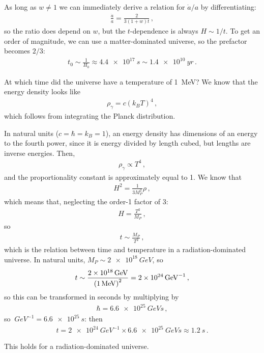 \documentclass[main.tex]{subfiles}
\begin{document}
As long as \(w \neq 1\) we can immediately derive a relation for \(\dot{a} / a \) by differentiating: 
%
\begin{align}
\frac{\dot{a}}{a} = \frac{2 }{3 (1+w) t}
\,,
\end{align}
%
so the ratio does depend on \(w\), but the \(t\)-dependence is always \(H \sim 1/t\). To get an order of magnitude, we can use a matter-dominated universe, so the prefactor becomes \(2/3\): 
%
\begin{align}
t_0 \sim \frac{1}{H_0} \approx  \SI{4.4e17}{s} \sim \SI{1.4e10}{yr}
\,.
\end{align}
%

At which time did the universe have a temperature of \SI{1 }{MeV}? We know that the energy density looks like 
%
\begin{align}
\rho_{\gamma } = c (k_B T)^{4}
\,,
\end{align}
%
which follows from integrating the Planck distribution. 

In natural units (\(c = \hbar = k_B =1\)), an energy density has dimensions of an energy to the fourth power, since it is energy divided by length cubed, but lengths are inverse energies. Then, 
%
\begin{align}
\rho_{\gamma } \propto T^{4}
\,,
\end{align}
and the proportionality constant is approximately equal to 1. 
We know that 
%
\begin{align}
H^2 = \frac{1}{3 M_P^2} \rho 
\,,
\end{align}
%
which  means that, neglecting the order-1 factor of 3:
%
\begin{align}
H = \frac{T^2}{M_P}
\,,
\end{align}
%
so 
%
\begin{align}
t \sim \frac{M_P}{T^2}
\,,
\end{align}
%
which is the relation between time and temperature in a radiation-dominated universe. In natural units, \(M_P \sim \SI{2e18 }{GeV}\), so 
%
\begin{align}
t \sim \frac{\SI{2e18}{GeV}}{\qty(\SI{1}{MeV})^2} = \SI{2e24}{GeV^{-1}}
\,,
\end{align}
%
so this can be transformed in seconds by multiplying by 
%
\begin{align}
\hbar = \SI{6.6e25}{GeV s}
\,,
\end{align}
%
so \(\SI{}{GeV^{-1}} = \SI{6.6e25}{s}\): then 
%
\begin{align}
t  = \SI{2e24}{GeV^{-1}} \times \SI{6.6e25}{GeV s} \approx \SI{1.2}{s}
\,.
\end{align}

This holds for a radiation-dominated universe. 
\end{document}
